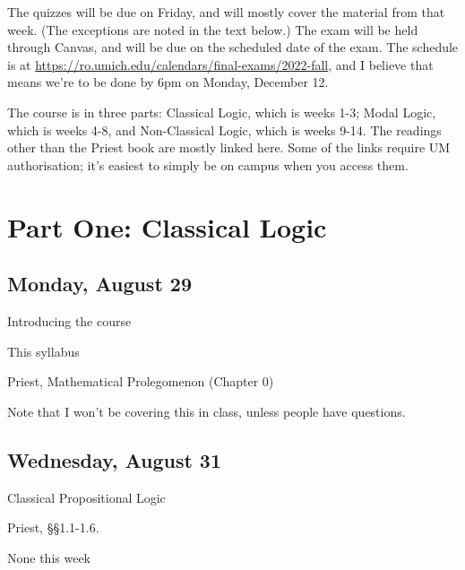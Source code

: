 \documentclass[
]{article}
\providecommand{\tightlist}{%
  \setlength{\itemsep}{0pt}\setlength{\parskip}{0pt}}\usepackage{longtable,booktabs,array}
\begin{document}
The quizzes will be due on Friday, and will mostly cover the material
from that week. (The exceptions are noted in the text below.) The exam
will be held through Canvas, and will be due on the scheduled date of
the exam. The schedule is at
\url{https://ro.umich.edu/calendars/final-exams/2022-fall}, and I
believe that means we're to be done by 6pm on Monday, December 12.

\newpage

The course is in three parts: Classical Logic, which is weeks 1-3; Modal
Logic, which is weeks 4-8, and Non-Classical Logic, which is weeks 9-14.
The readings other than the Priest book are mostly linked here. Some of
the links require UM authorisation; it's easiest to simply be on campus
when you access them.

\hypertarget{part-one-classical-logic}{%
\section{Part One: Classical Logic}\label{part-one-classical-logic}}

\hypertarget{monday-august-29}{%
\subsection{Monday, August 29}\label{monday-august-29}}

\begin{description}
\tightlist
\item[Topic]
Introducing the course
\item[Required Reading]
This syllabus
\item[Suggested Reading]
Priest, Mathematical Prolegomenon (Chapter 0)

Note that I won't be covering this in class, unless people have
questions.
\end{description}

\hypertarget{wednesday-august-31}{%
\subsection{Wednesday, August 31}\label{wednesday-august-31}}

\begin{description}
\tightlist
\item[Topic]
Classical Propositional Logic
\item[Required Reading]
Priest, §§1.1-1.6.
\item[Weekly Quiz]
None this week
\end{description}
\end{document}

